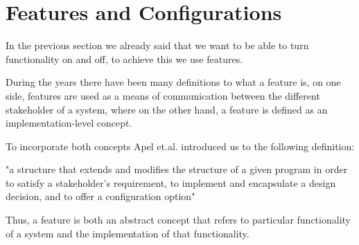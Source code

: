 \section{Features and Configurations}

In the previous section we already said that we want to be able to turn functionality on and off, to achieve this we use features.

During the years there have been many definitions to what a feature is, on one side, features are used as a means of communication between
the different stakeholder of a system, where on the other hand, a feature is defined as an implementation-level concept. 

To incorporate both concepts Apel et.al. \cite[p. 18]{Feature-Oriented-Software-Product-Lines} introduced us to the following definition:

"a structure that extends and modifies the structure of a
given program in order to satisfy a stakeholder's requirement, to implement and
encapsulate a design decision, and to offer a configuration option"

Thus, a feature is both an abstract concept that refers to particular functionality of a system and the implementation of that functionality.